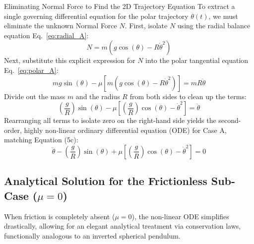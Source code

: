\documentclass[11pt,letterpaper]{article}
\begin{document}
\begin{equationbreakdown}{Eliminating Normal Force to Find the 2D Trajectory Equation}
To extract a single governing differential equation for the polar trajectory $\theta(t)$, we must eliminate the unknown Normal Force $N$.
First, isolate $N$ using the radial balance equation Eq.~\eqref{eq:radial_A}:
\begin{equation*}
N = m\left(g\cos(\theta) - R\dot{\theta}^2\right)
\end{equation*}
Next, substitute this explicit expression for $N$ into the polar tangential equation Eq.~\eqref{eq:polar_A}:
\begin{equation*}
mg\sin(\theta) - \mu \left[ m\left(g\cos(\theta) - R\dot{\theta}^2\right) \right] = mR\ddot{\theta}
\end{equation*}
Divide out the mass $m$ and the radius $R$ from both sides to clean up the terms:
\begin{equation*}
\left(\frac{g}{R}\right)\sin(\theta) - \mu \left[ \left(\frac{g}{R}\right)\cos(\theta) - \dot{\theta}^2 \right] = \ddot{\theta}
\end{equation*}
Rearranging all terms to isolate zero on the right-hand side yields the second-order, highly non-linear ordinary differential equation (ODE) for Case A, matching Equation (5c):
\begin{equation}\label{eq:eq5c_derived}
\ddot{\theta} - \left(\frac{g}{R}\right)\sin(\theta) + \mu\left[\left(\frac{g}{R}\right)\cos(\theta) - \dot{\theta}^2\right] = 0
\end{equation}
\end{equationbreakdown}

\subsection{Analytical Solution for the Frictionless Sub-Case ($\mu = 0$)}
When friction is completely absent ($\mu = 0$), the non-linear ODE simplifies drastically, allowing for an elegant analytical treatment via conservation laws, functionally analogous to an inverted spherical pendulum.
\end{document}
